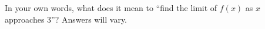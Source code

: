 {In your own words, what does it mean to ``find the limit of $f(x)$ as $x$ approaches 3''?}
{Answers will vary.}
